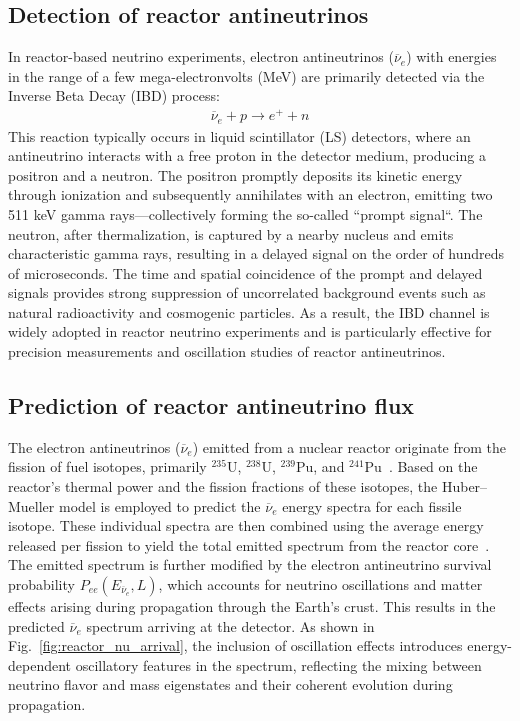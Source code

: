\documentclass[xetex,twocolumn,epjc3]{svjour3}
\begin{document}
\subsection{Detection of reactor antineutrinos}
\label{sec:theory}
In reactor-based neutrino experiments, electron antineutrinos ($\overline{\nu}_e$) with energies in the range of a few mega-electronvolts (MeV) are primarily detected via the Inverse Beta Decay (IBD) process:  
\begin{equation}   
    \begin{aligned}  
    \label{eq:ibd} 
\overline{\nu}_e + p \rightarrow e^+ + n 
    \end{aligned}
\end{equation}
This reaction typically occurs in liquid scintillator (LS) detectors, where an antineutrino interacts with a free proton in the detector medium, producing a positron and a neutron. The positron promptly deposits its kinetic energy through ionization and subsequently annihilates with an electron, emitting two 511 keV gamma rays—collectively forming the so-called ``prompt signal``. The neutron, after thermalization, is captured by a nearby nucleus and emits characteristic gamma rays, resulting in a delayed signal on the order of hundreds of microseconds. The time and spatial coincidence of the prompt and delayed signals provides strong suppression of uncorrelated background events such as natural radioactivity and cosmogenic particles. As a result, the IBD channel is widely adopted in reactor neutrino experiments and is particularly effective for precision measurements and oscillation studies of reactor antineutrinos.

\subsection{Prediction of reactor antineutrino flux}
\label{sec:Arrived neutrino spectrum}
The electron antineutrinos ($\overline{\nu}_e$) emitted from a nuclear reactor originate from the fission of fuel isotopes, primarily $^{235}$U, $^{238}$U, $^{239}$Pu, and $^{241}$Pu~\cite{Ma2013EnergyRelease}. Based on the reactor’s thermal power and the fission fractions of these isotopes, the Huber–Mueller model is employed to predict the $\overline{\nu}_e$ energy spectra for each fissile isotope. These individual spectra are then combined using the average energy released per fission to yield the total emitted spectrum from the reactor core~\cite{Huber2011, Mueller2011}. The emitted spectrum is further modified by the electron antineutrino survival probability $P_{ee}(E_{\overline{\nu}_e}, L)$, which accounts for neutrino oscillations and matter effects arising during propagation through the Earth's crust. This results in the predicted $\overline{\nu}_e$ spectrum arriving at the detector. As shown in Fig.~\ref{fig:reactor_nu_arrival}, the inclusion of oscillation effects introduces energy-dependent oscillatory features in the spectrum, reflecting the mixing between neutrino flavor and mass eigenstates and their coherent evolution during propagation.
\end{document}
